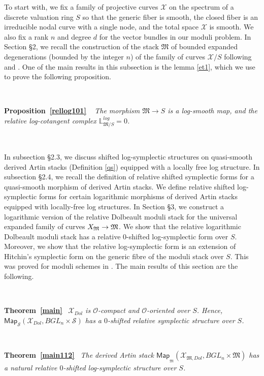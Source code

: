 \documentclass[11pt]{amsart}
\newcommand {\map} {\mathsf{Map}}
\theoremstyle{plain}
\numberwithin{equation}{section}
\theoremstyle{definition}
\theoremstyle{plain}
\begin{document}
To start with, we fix a family of projective curves $\mathcal X$ on the spectrum of a discrete valuation ring $S$ so that the generic fiber is smooth, the closed fiber is an irreducible nodal curve with a single node, and the total space $\mathcal X$ is smooth. We also fix a rank $n$ and degree $d$ for the vector bundles in our moduli problem. In Section \S2, we recall the construction of the stack $\mathfrak M$ of bounded expanded degenerations (bounded by the integer $n$) of the family of curves $\mathcal X/S$ following \cite{Li} and \cite{Z}. One of the main results in this subsection is the lemma \ref{et1}, which we use to prove the following proposition.

\

\noindent
{\bfseries Proposition~\ref{rellog101}} \ {\em
The morphism $\mathfrak M\longrightarrow S$ is a log-smooth map, and the relative log-cotangent complex $\mathbb L^{log}_{\mathfrak M/S}=0$. }

\

In subsection \S2.3, we discuss shifted log-symplectic structures on quasi-smooth derived Artin stacks (Definition \ref{qs}) equipped with a locally free log structure. In subsection \S2.4, we recall the definition of relative shifted symplectic forms for a quasi-smooth morphism of derived Artin stacks. We define relative shifted log-symplectic forms for certain logarithmic morphisms of derived Artin stacks equipped with locally-free log structures.
In Section \S3, we construct a logarithmic version of the relative Dolbeault moduli stack for the universal expanded family of curves $\mathcal \mathcal X_{\mathfrak M}\rightarrow \mathfrak M$. We show that the relative logarithmic Dolbeault moduli stack has a relative $0$-shifted log-symplectic form over $S$. Moreover, we show that the relative log-symplectic form is an extension of Hitchin's symplectic form on the generic fibre of the moduli stack over $S$. This was proved for moduli schemes in \cite{D}. The main results of this section are the following.

\

\noindent
{\bfseries Theorem~\ref{main}} \ {\em $\mathcal{X}_{ Dol}$ is $\mathcal{O}$-compact and $\mathcal O$-oriented over $S$. Hence,
$\map_{\mathcal{S}}(\mathcal X_{ Dol}, BGL_n\times \mathcal S)$ has a $0$-shifted relative symplectic structure over $S$.}

\

\noindent
{\bfseries Theorem~\ref{main112}} \ {\em The derived Artin stack $\map_{_{\mathfrak M}}(\mathcal X_{\mathfrak M, Dol}, BGL_n\times \mathfrak M)$ has a natural relative $0$-shifted log-symplectic structure over $S$.}
\end{document}

